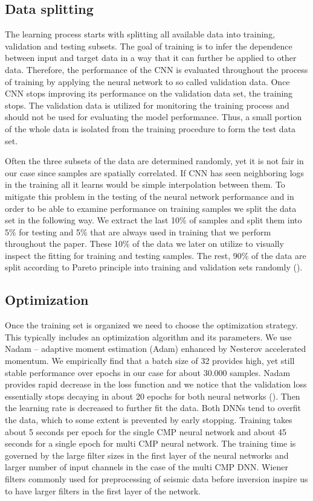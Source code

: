 \documentclass[paper,twocolomn]{geophysics}
\begin{document}
\subsection{Data splitting}
The learning process starts with splitting all available data into training, validation and testing subsets. 
The goal of training is
to infer the dependence between input and target data in a way that it can further be applied to other data. Therefore, the performance of the CNN is evaluated throughout the process of training by applying the neural network to so called validation data. Once CNN stops improving its performance on the validation data set, the training stops. The validation data is utilized for monitoring the training process and should not be used for evaluating the model performance.   Thus, a small portion of the whole data is isolated from the training procedure to form the test data set. 

Often the three subsets of the data are determined randomly, yet it is not fair in our case since samples are spatially correlated. If CNN has seen neighboring logs in the training all it learns would be simple interpolation between them. To mitigate this problem in the testing of the neural network performance and in order to be able to examine performance on training samples we split the data set in the following way. We extract the last 10\% of samples and split them into 5\% for testing and 5\% that are always used in training that we perform throughout the paper. These 10\% of the data we later on utilize to visually inspect the fitting for training and testing samples. The rest, 90\% of the data are split according to Pareto principle \citep{dunford2014pareto} into training and validation sets randomly ().


\subsection{Optimization}
Once the training set is organized we need to choose the optimization strategy. This typically includes an optimization algorithm and its parameters. We use Nadam \citep{dozat2016incorporating} -- adaptive moment estimation (Adam) enhanced by Nesterov accelerated momentum. We empirically find that a batch size of 32 provides high, yet still stable performance over epochs in our case for about 30.000 samples. Nadam provides rapid decrease in the loss function and we notice that the validation loss essentially stops decaying in about 20 epochs for both neural networks  (). Then the learning rate is decreased to further fit the data. Both DNNs tend to overfit the data, which to some extent is prevented by early stopping. Training takes about 5 seconds per epoch for the single CMP neural network and about 45 seconds for a single epoch for multi CMP neural network. The training time is governed by the large filter sizes in the first layer of the neural networks and larger number of input channels in the case of the multi CMP DNN. Wiener filters commonly used for preprocessing of seismic data before inversion \citep{claerbout1985fundamentals} inspire us to have larger filters in the first layer of the network. 
\end{document}

